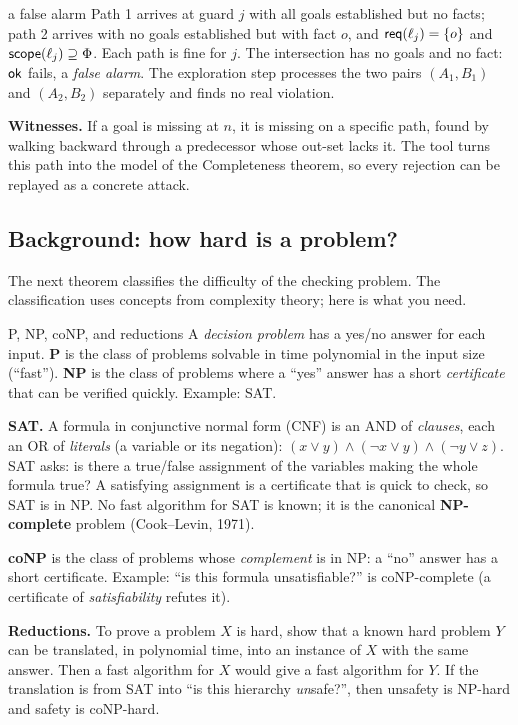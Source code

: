 \begin{example}{a false alarm}
Path 1 arrives at guard $j$ with all goals established but no facts; path 2 arrives with no goals established but with fact $o$, and $\mathsf{req}(\ell_j)=\{o\}$ and $\mathsf{scope}(\ell_j)\supseteq\Phi$. Each path is fine for $j$. The intersection has no goals and no fact: $\mathsf{ok}$ fails, a \emph{false alarm}. The exploration step processes the two pairs $(A_1,B_1)$ and $(A_2,B_2)$ separately and finds no real violation.
\end{example}

\textbf{Witnesses.} If a goal is missing at $n$, it is missing on a specific path, found by walking backward through a predecessor whose out-set lacks it. The tool turns this path into the model of the Completeness theorem, so every rejection can be replayed as a concrete attack.

\subsection{Background: how hard is a problem?}

The next theorem classifies the difficulty of the checking problem. The classification uses concepts from complexity theory; here is what you need.

\begin{toolbox}{P, NP, coNP, and reductions}
A \emph{decision problem} has a yes/no answer for each input. \textbf{P} is the class of problems solvable in time polynomial in the input size (``fast''). \textbf{NP} is the class of problems where a ``yes'' answer has a short \emph{certificate} that can be verified quickly. Example: SAT.

\textbf{SAT.} A formula in conjunctive normal form (CNF) is an AND of \emph{clauses}, each an OR of \emph{literals} (a variable or its negation): $(x\vee y)\wedge(\neg x\vee y)\wedge(\neg y\vee z)$. SAT asks: is there a true/false assignment of the variables making the whole formula true? A satisfying assignment is a certificate that is quick to check, so SAT is in NP. No fast algorithm for SAT is known; it is the canonical \textbf{NP-complete} problem (Cook--Levin, 1971).

\textbf{coNP} is the class of problems whose \emph{complement} is in NP: a ``no'' answer has a short certificate. Example: ``is this formula unsatisfiable?'' is coNP-complete (a certificate of \emph{satisfiability} refutes it).

\textbf{Reductions.} To prove a problem $X$ is hard, show that a known hard problem $Y$ can be translated, in polynomial time, into an instance of $X$ with the same answer. Then a fast algorithm for $X$ would give a fast algorithm for $Y$. If the translation is from SAT into ``is this hierarchy \emph{un}safe?'', then unsafety is NP-hard and safety is coNP-hard.
\end{toolbox}

